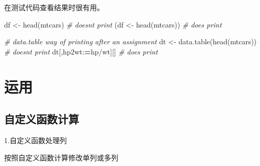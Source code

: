 \documentclass[
]{book}
\newenvironment{Shaded}{\begin{snugshade}}{\end{snugshade}}
\newcommand{\CommentTok}[1]{\textcolor[rgb]{0.56,0.35,0.01}{\textit{#1}}}
\newcommand{\ErrorTok}[1]{\textcolor[rgb]{0.64,0.00,0.00}{\textbf{#1}}}
\newcommand{\FunctionTok}[1]{\textcolor[rgb]{0.00,0.00,0.00}{#1}}
\newcommand{\NormalTok}[1]{#1}
\newcommand{\OtherTok}[1]{\textcolor[rgb]{0.56,0.35,0.01}{#1}}
\newcommand{\SpecialCharTok}[1]{\textcolor[rgb]{0.00,0.00,0.00}{#1}}
\begin{document}
在测试代码查看结果时很有用。

\begin{Shaded}
\begin{Highlighting}[]
\NormalTok{df }\OtherTok{\textless{}{-}} \FunctionTok{head}\NormalTok{(mtcars) }\CommentTok{\# doesn\textquotesingle{}t print}
\NormalTok{(df }\OtherTok{\textless{}{-}} \FunctionTok{head}\NormalTok{(mtcars)) }\CommentTok{\# does print}
\end{Highlighting}
\end{Shaded}

\begin{Shaded}
\begin{Highlighting}[]
\CommentTok{\# data.table way of printing after an assignment}
\NormalTok{dt }\OtherTok{\textless{}{-}} \FunctionTok{data.table}\NormalTok{(}\FunctionTok{head}\NormalTok{(mtcars)) }\CommentTok{\# doesn\textquotesingle{}t print}
\NormalTok{dt[,hp2wt}\SpecialCharTok{:}\ErrorTok{=}\NormalTok{hp}\SpecialCharTok{/}\NormalTok{wt][] }\CommentTok{\# does print}
\end{Highlighting}
\end{Shaded}

\hypertarget{ux8fd0ux7528}{%
\section{运用}\label{ux8fd0ux7528}}

\hypertarget{ux81eaux5b9aux4e49ux51fdux6570ux8ba1ux7b97}{%
\subsection{自定义函数计算}\label{ux81eaux5b9aux4e49ux51fdux6570ux8ba1ux7b97}}

1.自定义函数处理列

按照自定义函数计算修改单列或多列
\end{document}
